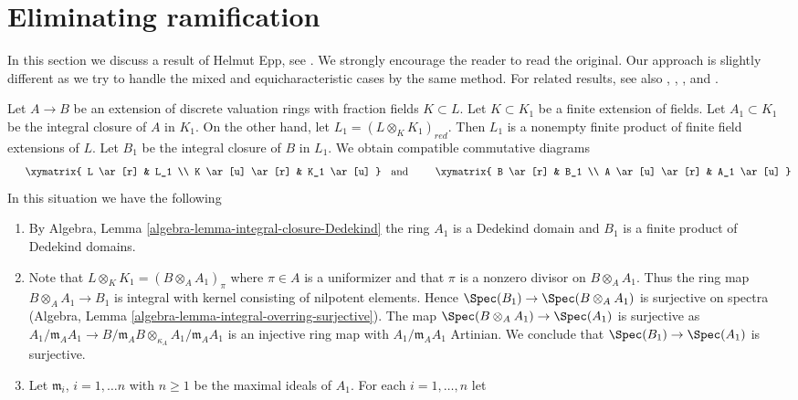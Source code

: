 \section{Eliminating ramification}
\label{section-eliminating-ramification}

\noindent
In this section we discuss a result of Helmut Epp, see \cite{Epp}. We strongly
encourage the reader to read the original. Our approach is slightly different
as we try to handle the mixed and equicharacteristic cases by the same method.
For related results, see also
\cite{Ponomarev}, \cite{Ponomarev-Abhyankar}, \cite{Kuhlmann}, and \cite{ZK}.

\begin{remark}
\label{remark-construction}
Let $A \to B$ be an extension of discrete valuation rings with fraction
fields $K \subset L$. Let $K \subset K_1$ be a finite extension of
fields. Let $A_1 \subset K_1$ be the integral closure of $A$ in $K_1$.
On the other hand, let $L_1 = (L \otimes_K K_1)_{red}$. Then $L_1$ is a
nonempty finite product of finite field extensions of $L$. Let $B_1$ be
the integral closure of $B$ in $L_1$. We obtain compatible commutative
diagrams
$$
\vcenter{
\xymatrix{
L \ar[r] & L_1 \\
K \ar[u] \ar[r] & K_1 \ar[u]
}
}
\quad\text{and}\quad
\vcenter{
\xymatrix{
B \ar[r] & B_1 \\
A \ar[u] \ar[r] & A_1 \ar[u]
}
}
$$
In this situation we have the following
\begin{enumerate}
\item By Algebra, Lemma \ref{algebra-lemma-integral-closure-Dedekind}
the ring $A_1$ is a Dedekind domain and $B_1$ is a finite product of
Dedekind domains.
\item Note that $L \otimes_K K_1 = (B \otimes_A A_1)_\pi$ where $\pi \in A$
is a uniformizer and that $\pi$ is a nonzero divisor on $B \otimes_A A_1$. 
Thus the ring map $B \otimes_A A_1 \to B_1$ is integral with kernel
consisting of nilpotent elements. Hence $\Spec(B_1) \to \Spec(B \otimes_A A_1)$
is surjective on spectra
(Algebra, Lemma \ref{algebra-lemma-integral-overring-surjective}).
The map $\Spec(B \otimes_A A_1) \to \Spec(A_1)$ is surjective as
$A_1/\mathfrak m_A A_1 \to
B/\mathfrak m_AB \otimes_{\kappa_A} A_1/\mathfrak m_A A_1$
is an injective ring map with $A_1/\mathfrak m_A A_1$ Artinian.
We conclude that $\Spec(B_1) \to \Spec(A_1)$ is surjective.
\item Let $\mathfrak m_i$, $i = 1, \ldots n$ with $n \geq 1$ be the
maximal ideals of $A_1$. For each $i = 1, \ldots, n$ let

\end{enumerate}
\end{remark}
